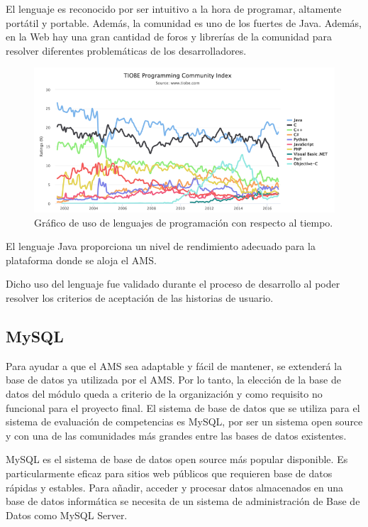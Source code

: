 El lenguaje es reconocido por ser intuitivo a la hora de programar, altamente portátil y portable\citep{hunt2011java}. Además, la comunidad es uno de los fuertes de Java. Además, en la Web hay una gran cantidad de foros y librerías de la comunidad para resolver diferentes problemáticas de los desarrolladores.

\begin{figure}[H]
\centering
\includegraphics[width=125mm,scale=1]{Figuras/tecnologias/java}
\caption{Gráfico de uso de lenguajes de programación con respecto al tiempo.}
  \label{graph_java}
\end{figure}

El lenguaje Java proporciona un nivel de rendimiento adecuado para la plataforma donde se aloja el AMS.

Dicho uso del lenguaje fue validado durante el proceso de desarrollo al poder resolver los criterios de aceptación de las historias de usuario.

\subsection{MySQL}
Para ayudar a que el AMS sea adaptable y fácil de mantener, se extenderá la base de datos ya utilizada por el AMS. Por lo tanto, la elección de la base de datos del módulo queda a criterio de la organización y como requisito no funcional para el proyecto final. El sistema de base de datos que se utiliza para el sistema de evaluación de competencias es MySQL, por ser un sistema open source y con una de las comunidades más grandes entre las bases de datos existentes.

MySQL es el sistema de base de datos open source más popular disponible. Es particularmente eficaz para sitios web públicos que requieren base de datos rápidas y estables\citep{dyer2015learning}. Para añadir, acceder y procesar datos almacenados en una base de datos informática se necesita de un sistema de administración de Base de Datos como MySQL Server. 

